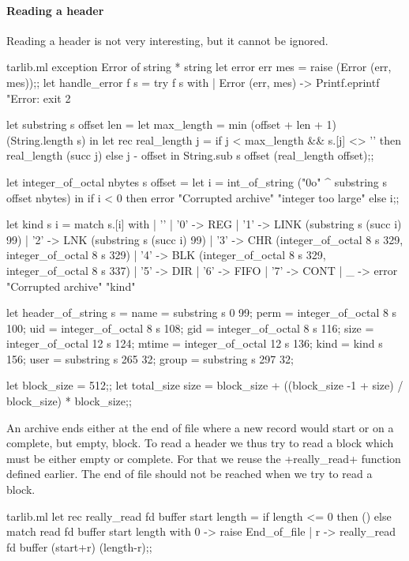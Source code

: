 \paragraph {Reading a header}
Reading a header is not very interesting, but it cannot be ignored.
%
\begin{listingcodefile}{tarlib.ml}
exception Error of string * string
let error err mes = raise (Error (err, mes));;
let handle_error f s = 
  try f s with 
  | Error (err, mes) -> 
      Printf.eprintf "Error: %
      exit 2
        
let substring s offset len = 
  let max_length = min (offset + len + 1) (String.length s) in
  let rec real_length j =
    if j < max_length && s.[j] <> '' then real_length (succ j) 
    else j - offset in
  String.sub s offset (real_length offset);;

let integer_of_octal nbytes s offset =
  let i = int_of_string ("0o" ^ substring s offset nbytes) in
  if i < 0 then error "Corrupted archive" "integer too large" else i;;

let kind s i = match s.[i] with
  | '' | '0' -> REG
  | '1' -> LINK (substring s (succ i) 99)
  | '2' -> LNK (substring s (succ i) 99)
  | '3' -> CHR (integer_of_octal 8 s 329, integer_of_octal 8 s 329)
  | '4' -> BLK (integer_of_octal 8 s 329, integer_of_octal 8 s 337)
  | '5' -> DIR | '6' -> FIFO | '7' -> CONT
  | _ -> error "Corrupted archive" "kind"
        
let header_of_string s =
  { name = substring s 0 99;
    perm = integer_of_octal 8 s 100;
    uid = integer_of_octal 8 s 108;
    gid = integer_of_octal 8 s 116;
    size = integer_of_octal 12 s 124; 
    mtime = integer_of_octal 12 s 136;
    kind = kind s 156;
    user = substring s 265 32;
    group = substring s 297 32; }
    
let block_size = 512;;
let total_size size = 
  block_size + ((block_size -1 + size) / block_size) * block_size;;    
\end{listingcodefile}
% 
An archive ends either at the end of file where a new record would
start or on a complete, but empty, block. To read a header we thus try
to read a block which must be either empty or complete. For that we
reuse the \ml+really_read+ function defined earlier. The end of file
should not be reached when we try to read a block.
%
\begin{codefile}{tarlib.ml}
let rec really_read fd buffer start length =
  if length <= 0 then () else
    match read fd buffer start length with
      0 -> raise End_of_file
    | r -> really_read fd buffer (start+r) (length-r);;
\end{codefile}
